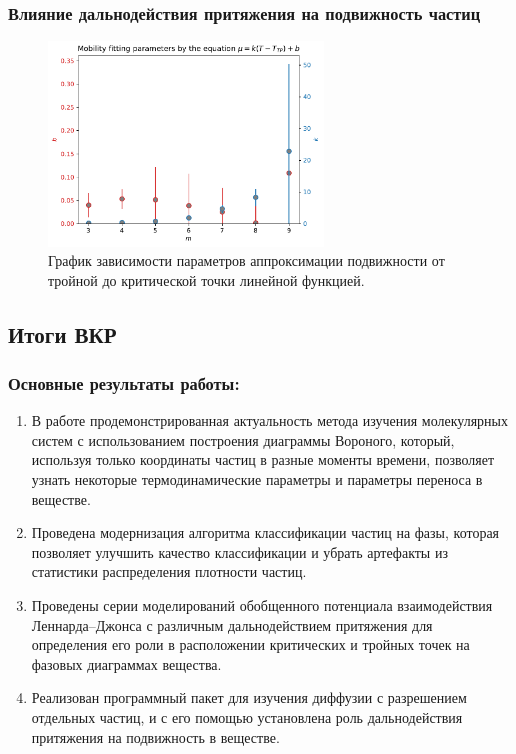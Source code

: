 \documentclass[pdf,hyperref={unicode}]{beamer}
\begin{document}
\begin{frame}
\transdissolve[duration=0.2]
\frametitle{Влияние дальнодействия притяжения на подвижность частиц}

\begin{figure}[h]
\begin{center}
\includegraphics[width=0.65\textwidth]{mobility_fitting_factors}
\caption{\tiny График зависимости параметров аппроксимации подвижности от тройной до критической точки линейной функцией.}
\label{risFittingFactors}
\end{center}
\end{figure}

\end{frame}





\subsection{Итоги ВКР}


\begin{frame}
	\transdissolve[duration=0.2]
	\frametitle{Основные результаты работы:}
	\footnotesize{
\begin{enumerate}
    \item В работе продемонстрированная актуальность метода изучения молекулярных систем с использованием построения диаграммы Вороного, который, используя только координаты частиц в разные моменты времени, позволяет узнать некоторые термодинамические параметры и параметры переноса в веществе.
    \item Проведена модернизация алгоритма классификации частиц на фазы, которая позволяет улучшить качество классификации и убрать артефакты из статистики распределения плотности частиц.
    \item Проведены серии моделирований обобщенного потенциала взаимодействия Леннарда--Джонса с различным дальнодействием притяжения для определения его роли в расположении критических и тройных точек на фазовых диаграммах вещества. 
    \item Реализован программный пакет для изучения диффузии с разрешением отдельных частиц, и с его помощью установлена роль дальнодействия притяжения на подвижность в веществе. 
\end{enumerate}
	}
\end{frame}
\end{document}
